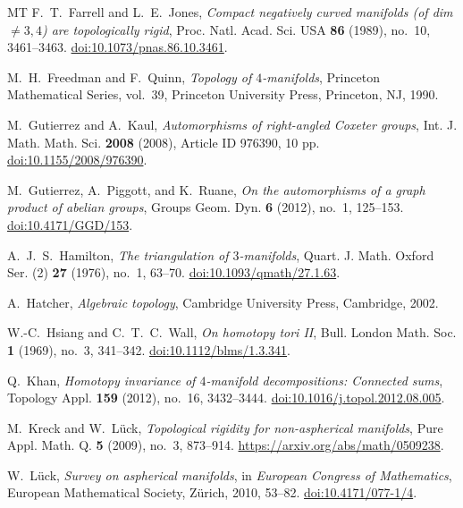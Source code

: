 \begin{thebibliography}{MT}
F.~T.~Farrell and L.~E.~Jones,
\emph{Compact negatively curved manifolds (of dim $\ne 3,4$) are topologically rigid},
Proc. Natl. Acad. Sci. USA \textbf{86} (1989), no.~10, 3461--3463.
\href{https://doi.org/10.1073/pnas.86.10.3461}{doi:10.1073/pnas.86.10.3461}.

M.~H.~Freedman and F.~Quinn,
\emph{Topology of $4$-manifolds},
Princeton Mathematical Series, vol.~39,
Princeton University Press, Princeton, NJ, 1990.

M.~Gutierrez and A.~Kaul,
\emph{Automorphisms of right-angled Coxeter groups},
Int. J. Math. Math. Sci. \textbf{2008} (2008), Article ID 976390, 10 pp.
\href{https://doi.org/10.1155/2008/976390}{doi:10.1155/2008/976390}.

M.~Gutierrez, A.~Piggott, and K.~Ruane,
\emph{On the automorphisms of a graph product of abelian groups},
Groups Geom. Dyn. \textbf{6} (2012), no.~1, 125--153.
\href{https://doi.org/10.4171/GGD/153}{doi:10.4171/GGD/153}.

A.~J.~S.~Hamilton,
\emph{The triangulation of $3$-manifolds},
Quart. J. Math. Oxford Ser. (2) \textbf{27} (1976), no.~1, 63--70.
\href{https://doi.org/10.1093/qmath/27.1.63}{doi:10.1093/qmath/27.1.63}.

A.~Hatcher,
\emph{Algebraic topology},
Cambridge University Press, Cambridge, 2002.

W.-C.~Hsiang and C.~T.~C.~Wall,
\emph{On homotopy tori II},
Bull. London Math. Soc. \textbf{1} (1969), no.~3, 341--342.
\href{https://doi.org/10.1112/blms/1.3.341}{doi:10.1112/blms/1.3.341}.

Q.~Khan,
\emph{Homotopy invariance of $4$-manifold decompositions: Connected sums},
Topology Appl. \textbf{159} (2012), no.~16, 3432--3444.
\href{https://doi.org/10.1016/j.topol.2012.08.005}{doi:10.1016/j.topol.2012.08.005}.

M.~Kreck and W.~L\"uck,
\emph{Topological rigidity for non-aspherical manifolds},
Pure Appl. Math. Q. \textbf{5} (2009), no.~3, 873--914.
\url{https://arxiv.org/abs/math/0509238}.

W.~L\"uck,
\emph{Survey on aspherical manifolds},
in \emph{European Congress of Mathematics},
European Mathematical Society, Z\"urich, 2010, 53--82.
\href{https://doi.org/10.4171/077-1/4}{doi:10.4171/077-1/4}.


\end{thebibliography}
